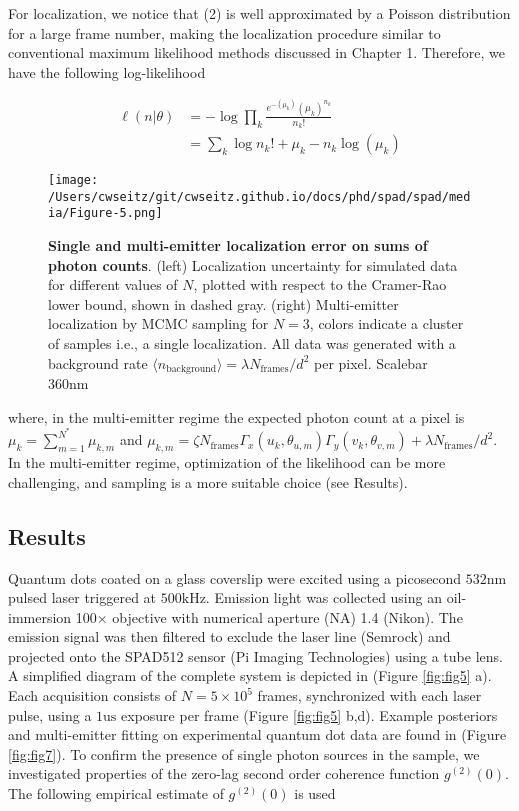 For localization, we notice that (2) is well approximated by a Poisson distribution for a large frame number, making the localization procedure similar to conventional maximum likelihood methods discussed in Chapter 1. Therefore, we have the following log-likelihood


\begin{align}
\ell(n\lvert \theta) &= -\log \prod_{k} \frac{e^{-\left(\mu_{k}\right)}\left(\mu_{k}\right)^{n_k}}{n_k!}\\
&= \sum_{k}  \log n_k! + \mu_{k} - n_k\log\left(\mu_{k}\right)
\end{align}

\begin{figure*}[t]
\centering
\texttt{[image: /Users/cwseitz/git/cwseitz.github.io/docs/phd/spad/spad/media/Figure-5.png]}
\caption{\textbf{Single and multi-emitter localization error on sums of photon counts}. (left) Localization uncertainty for simulated data for different values of $N$, plotted with respect to the Cramer-Rao lower bound, shown in dashed gray. (right) Multi-emitter localization by MCMC sampling for $N=3$, colors indicate a cluster of samples i.e., a single localization. All data was generated with a background rate $\langle n_{\mathrm{background}} \rangle = \lambda N_{\mathrm{frames}}/d^{2}$ per pixel. Scalebar 360nm}
\label{fig:fig6}
\end{figure*}   

where, in the multi-emitter regime the expected photon count at a pixel is $\mu_{k} = \sum_{m=1}^{N^{*}} \mu_{k,m}$ and $\mu_{k,m}=\zeta N_{\mathrm{frames}}\Gamma_{x}(u_k,\theta_{u,m})\Gamma_{y}(v_k,\theta_{v,m}) + \lambda N_{\mathrm{frames}}/d^{2}$. In the multi-emitter regime, optimization of the likelihood can be more challenging, and sampling is a more suitable choice (see Results). 


\subsection{Results}

Quantum dots coated on a glass coverslip were excited using a picosecond $532\mathrm{nm}$ pulsed laser triggered at $500\mathrm{kHz}$. Emission light was collected using an oil-immersion 100$\times$ objective with numerical aperture (NA) 1.4 (Nikon). The emission signal was then filtered to exclude the laser line (Semrock) and projected onto the SPAD512 sensor (Pi Imaging Technologies) using a tube lens. A simplified diagram of the complete system is depicted in (Figure \ref{fig:fig5} a). Each acquisition consists of $N=5\times 10^{5}$ frames, synchronized with each laser pulse, using a $1\mathrm{us}$ exposure per frame (Figure \ref{fig:fig5} b,d). Example posteriors and multi-emitter fitting on experimental quantum dot data are found in (Figure \ref{fig:fig7}). To confirm the presence of single photon sources in the sample, we investigated properties of the zero-lag second order coherence function $g^{(2)}(0)$. The following empirical estimate of $g^{(2)}(0)$ is used \parencite{Israel2017}

